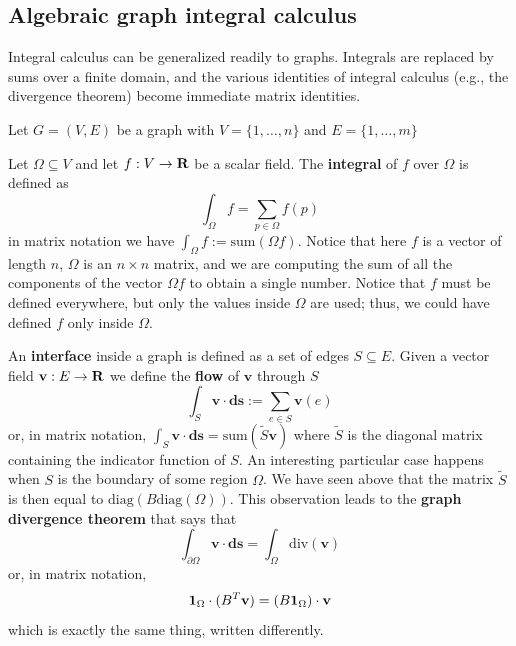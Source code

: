 \subsection{Algebraic graph integral calculus}


Integral calculus can be generalized readily to graphs.  Integrals are
replaced by sums over a finite domain, and the various identities of integral
calculus (e.g., the divergence theorem) become immediate matrix identities.



Let $G=(V,E)$ be a graph with $V=\{1,\ldots,n\}$ and $E=\{1,\ldots,m\}$



Let $\Omega\subseteq V$ and let $f:V\to\mathbf{R}$ be a scalar field.
The {\bf integral} of $f$ over $\Omega$ is defined as
\[
\int_\Omega f=\sum_{p\in \Omega}f(p)
\]
in matrix notation we have
\(
\int_\Omega f := \mathrm{sum}(\Omega f).
\)
Notice that here $f$ is a vector of length $n$, $\Omega$ is an $n\times n$
matrix, and we are computing the sum of all the components of the vector
$\Omega f$ to obtain a single number.
Notice that $f$ must be defined everywhere, but only the values inside
$\Omega$ are used; thus, we could have defined $f$ only inside $\Omega$.



An {\bf interface} inside a graph  is defined as a set of edges $S\subseteq
E$.  Given a vector field $\mathbf{v}:E\to\mathbf{R}$ we define the {\bf flow}
of $\mathbf{v}$ through $S$
\[
\int_S \mathbf{v\cdot ds} := \sum_{e\in S}\mathbf{v}(e)
\]
or, in matrix notation, $\int_S \mathbf{v\cdot ds}=\mathrm{sum}(\tilde S
\mathbf{v})$ where $\tilde S$ is the diagonal matrix containing the indicator
function of $S$.
An interesting particular case happens when $S$ is the boundary of some
region $\Omega$.  We have seen above that the matrix $\tilde S$ is then
equal to $\mathrm{diag}(B\mathrm{diag}(\Omega))$.  This observation leads to the {\bf graph divergence
	theorem} that says that
\[
\int_{\partial\Omega} \mathbf{v\cdot ds} =\int_\Omega\mathrm{div}(\mathbf{v})
\]
or, in matrix notation,
\[
\mathbf{1}_\Omega\cdot(B^T\mathbf{v})
=
(B\mathbf{1}_\Omega)\cdot\mathbf{v}
\]
which is exactly the same thing, written differently.



